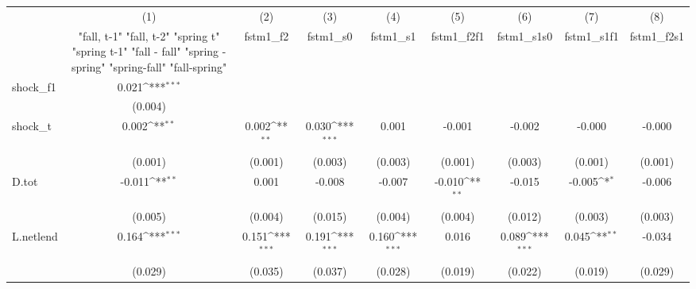 {
\def\sym#1{\ifmmode^{#1}\else\(^{#1}\)\fi}
\begin{tabular}{l*{8}{c}}
\toprule
            &\multicolumn{1}{c}{(1)}&\multicolumn{1}{c}{(2)}&\multicolumn{1}{c}{(3)}&\multicolumn{1}{c}{(4)}&\multicolumn{1}{c}{(5)}&\multicolumn{1}{c}{(6)}&\multicolumn{1}{c}{(7)}&\multicolumn{1}{c}{(8)}\\
            &\multicolumn{1}{c}{  "fall, t-1" "fall, t-2" "spring t" "spring t-1"  "fall - fall" "spring - spring" "spring-fall" "fall-spring" }&\multicolumn{1}{c}{fstm1\_f2}&\multicolumn{1}{c}{fstm1\_s0}&\multicolumn{1}{c}{fstm1\_s1}&\multicolumn{1}{c}{fstm1\_f2f1}&\multicolumn{1}{c}{fstm1\_s1s0}&\multicolumn{1}{c}{fstm1\_s1f1}&\multicolumn{1}{c}{fstm1\_f2s1}\\
\midrule
shock\_f1    &       0.021\sym{***}&                     &                     &                     &                     &                     &                     &                     \\
            &     (0.004)         &                     &                     &                     &                     &                     &                     &                     \\
\addlinespace
shock\_t     &       0.002\sym{**} &       0.002\sym{**} &       0.030\sym{***}&       0.001         &      -0.001         &      -0.002         &      -0.000         &      -0.000         \\
            &     (0.001)         &     (0.001)         &     (0.003)         &     (0.003)         &     (0.001)         &     (0.003)         &     (0.001)         &     (0.001)         \\
\addlinespace
D.tot       &      -0.011\sym{**} &       0.001         &      -0.008         &      -0.007         &      -0.010\sym{**} &      -0.015         &      -0.005\sym{*}  &      -0.006         \\
            &     (0.005)         &     (0.004)         &     (0.015)         &     (0.004)         &     (0.004)         &     (0.012)         &     (0.003)         &     (0.003)         \\
\addlinespace
L.netlend   &       0.164\sym{***}&       0.151\sym{***}&       0.191\sym{***}&       0.160\sym{***}&       0.016         &       0.089\sym{***}&       0.045\sym{**} &      -0.034         \\
            &     (0.029)         &     (0.035)         &     (0.037)         &     (0.028)         &     (0.019)         &     (0.022)         &     (0.019)         &     (0.029)         \\

\end{tabular}}
